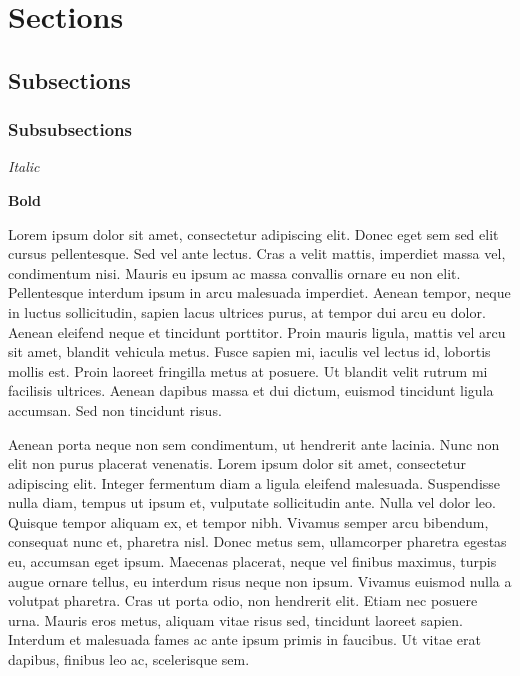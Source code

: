\documentclass[a4paper,12pt,twoside]{article}
\begin{document}


\newpage

\tableofcontents


\parindent=0pt
\parskip=6pt

\newpage


\section{Sections} \subsection{Subsections} \subsubsection{Subsubsections}

\par

\textit{Italic}

\par

\textbf{Bold}

\par

Lorem ipsum dolor sit amet, consectetur adipiscing elit. Donec eget sem sed elit cursus pellentesque. Sed vel ante lectus. Cras a velit mattis, imperdiet massa vel, condimentum nisi. Mauris eu ipsum ac massa convallis ornare eu non elit. Pellentesque interdum ipsum in arcu malesuada imperdiet. Aenean tempor, neque in luctus sollicitudin, sapien lacus ultrices purus, at tempor dui arcu eu dolor. Aenean eleifend neque et tincidunt porttitor. Proin mauris ligula, mattis vel arcu sit amet, blandit vehicula metus. Fusce sapien mi, iaculis vel lectus id, lobortis mollis est. Proin laoreet fringilla metus at posuere. Ut blandit velit rutrum mi facilisis ultrices. Aenean dapibus massa et dui dictum, euismod tincidunt ligula accumsan. Sed non tincidunt risus.

\par

Aenean porta neque non sem condimentum, ut hendrerit ante lacinia. Nunc non elit non purus placerat venenatis. Lorem ipsum dolor sit amet, consectetur adipiscing elit. Integer fermentum diam a ligula eleifend malesuada. Suspendisse nulla diam, tempus ut ipsum et, vulputate sollicitudin ante. Nulla vel dolor leo. Quisque tempor aliquam ex, et tempor nibh. Vivamus semper arcu bibendum, consequat nunc et, pharetra nisl. Donec metus sem, ullamcorper pharetra egestas eu, accumsan eget ipsum. Maecenas placerat, neque vel finibus maximus, turpis augue ornare tellus, eu interdum risus neque non ipsum. Vivamus euismod nulla a volutpat pharetra. Cras ut porta odio, non hendrerit elit. Etiam nec posuere urna. Mauris eros metus, aliquam vitae risus sed, tincidunt laoreet sapien. Interdum et malesuada fames ac ante ipsum primis in faucibus. Ut vitae erat dapibus, finibus leo ac, scelerisque sem.
\end{document}
